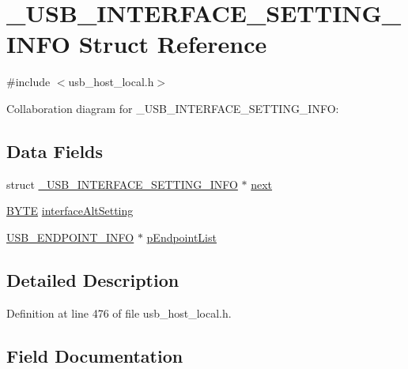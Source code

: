 \hypertarget{struct___u_s_b___i_n_t_e_r_f_a_c_e___s_e_t_t_i_n_g___i_n_f_o}{}\section{\+\_\+\+U\+S\+B\+\_\+\+I\+N\+T\+E\+R\+F\+A\+C\+E\+\_\+\+S\+E\+T\+T\+I\+N\+G\+\_\+\+I\+N\+F\+O Struct Reference}
\label{struct___u_s_b___i_n_t_e_r_f_a_c_e___s_e_t_t_i_n_g___i_n_f_o}


{\ttfamily \#include $<$usb\+\_\+host\+\_\+local.\+h$>$}



Collaboration diagram for \+\_\+\+U\+S\+B\+\_\+\+I\+N\+T\+E\+R\+F\+A\+C\+E\+\_\+\+S\+E\+T\+T\+I\+N\+G\+\_\+\+I\+N\+F\+O\+:
\subsection*{Data Fields}
\begin{DoxyCompactItemize}
\item 
struct \hyperlink{struct___u_s_b___i_n_t_e_r_f_a_c_e___s_e_t_t_i_n_g___i_n_f_o}{\+\_\+\+U\+S\+B\+\_\+\+I\+N\+T\+E\+R\+F\+A\+C\+E\+\_\+\+S\+E\+T\+T\+I\+N\+G\+\_\+\+I\+N\+F\+O} $\ast$ \hyperlink{struct___u_s_b___i_n_t_e_r_f_a_c_e___s_e_t_t_i_n_g___i_n_f_o_a937e8231da028f8464d6145526ce9332}{next}
\item 
\hyperlink{_generic_type_defs_8h_a4ae1dab0fb4b072a66584546209e7d58}{B\+Y\+T\+E} \hyperlink{struct___u_s_b___i_n_t_e_r_f_a_c_e___s_e_t_t_i_n_g___i_n_f_o_a98dcaa9ba2f52c486344aff447229585}{interface\+Alt\+Setting}
\item 
\hyperlink{usb__host__local_8h_a22e050cf26f84434f96fbf7272b40ad6}{U\+S\+B\+\_\+\+E\+N\+D\+P\+O\+I\+N\+T\+\_\+\+I\+N\+F\+O} $\ast$ \hyperlink{struct___u_s_b___i_n_t_e_r_f_a_c_e___s_e_t_t_i_n_g___i_n_f_o_a8a0aeb0f0802cc4fcf7ebd3f20248ebe}{p\+Endpoint\+List}
\end{DoxyCompactItemize}


\subsection{Detailed Description}


Definition at line 476 of file usb\+\_\+host\+\_\+local.\+h.



\subsection{Field Documentation}
\hypertarget{struct___u_s_b___i_n_t_e_r_f_a_c_e___s_e_t_t_i_n_g___i_n_f_o_a98dcaa9ba2f52c486344aff447229585}{}
